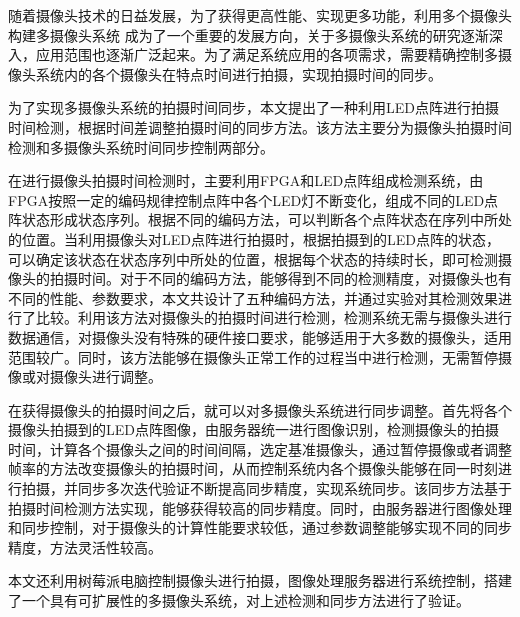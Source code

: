 \makeatletter
\ifthu@bachelor\relax\else
  \ifthu@doctor
  \else
    \ifthu@master
    \fi
  \fi
\fi
\makeatother



\begin{cabstract}

随着摄像头技术的日益发展，为了获得更高性能、实现更多功能，利用多个摄像头构建多摄像头系统 成为了一个重要的发展方向，关于多摄像头系统的研究逐渐深入，应用范围也逐渐广泛起来。为了满足系统应用的各项需求，需要精确控制多摄像头系统内的各个摄像头在特点时间进行拍摄，实现拍摄时间的同步。

为了实现多摄像头系统的拍摄时间同步，本文提出了一种利用LED点阵进行拍摄时间检测，根据时间差调整拍摄时间的同步方法。该方法主要分为摄像头拍摄时间检测和多摄像头系统时间同步控制两部分。

在进行摄像头拍摄时间检测时，主要利用FPGA和LED点阵组成检测系统，由FPGA按照一定的编码规律控制点阵中各个LED灯不断变化，组成不同的LED点阵状态形成状态序列。根据不同的编码方法，可以判断各个点阵状态在序列中所处的位置。当利用摄像头对LED点阵进行拍摄时，根据拍摄到的LED点阵的状态，可以确定该状态在状态序列中所处的位置，根据每个状态的持续时长，即可检测摄像头的拍摄时间。对于不同的编码方法，能够得到不同的检测精度，对摄像头也有不同的性能、参数要求，本文共设计了五种编码方法，并通过实验对其检测效果进行了比较。利用该方法对摄像头的拍摄时间进行检测，检测系统无需与摄像头进行数据通信，对摄像头没有特殊的硬件接口要求，能够适用于大多数的摄像头，适用范围较广。同时，该方法能够在摄像头正常工作的过程当中进行检测，无需暂停摄像或对摄像头进行调整。

在获得摄像头的拍摄时间之后，就可以对多摄像头系统进行同步调整。首先将各个摄像头拍摄到的LED点阵图像，由服务器统一进行图像识别，检测摄像头的拍摄时间，计算各个摄像头之间的时间间隔，选定基准摄像头，通过暂停摄像或者调整帧率的方法改变摄像头的拍摄时间，从而控制系统内各个摄像头能够在同一时刻进行拍摄，并同步多次迭代验证不断提高同步精度，实现系统同步。该同步方法基于拍摄时间检测方法实现，能够获得较高的同步精度。同时，由服务器进行图像处理和同步控制，对于摄像头的计算性能要求较低，通过参数调整能够实现不同的同步精度，方法灵活性较高。

本文还利用树莓派电脑控制摄像头进行拍摄，图像处理服务器进行系统控制，搭建了一个具有可扩展性的多摄像头系统，对上述检测和同步方法进行了验证。
\end{cabstract}

